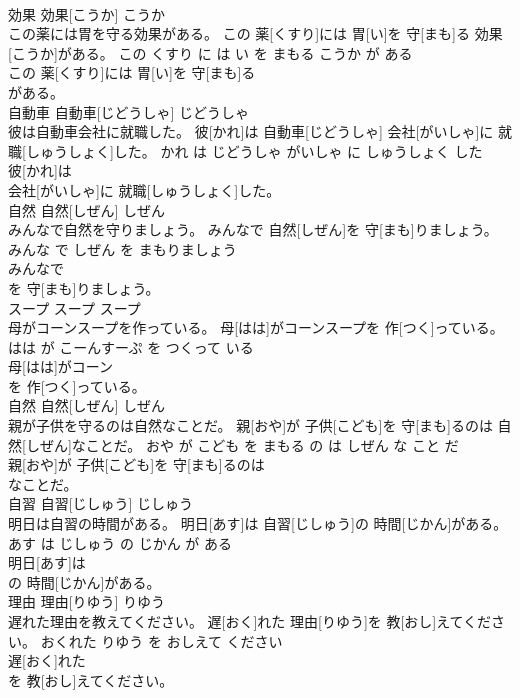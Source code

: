 \documentclass[8pt]{extreport}
\begin{document}
\begin{CJK}{UTF8}{min}
\\	効果	効果[こうか]	こうか	
\\	この薬には胃を守る効果がある。	この 薬[くすり]には 胃[い]を 守[まも]る 効果[こうか]がある。	この くすり に は い を まもる こうか が ある	
\\	この 薬[くすり]には 胃[い]を 守[まも]る
\\	がある。		
\\	自動車	自動車[じどうしゃ]	じどうしゃ	
\\	彼は自動車会社に就職した。	彼[かれ]は 自動車[じどうしゃ] 会社[がいしゃ]に 就職[しゅうしょく]した。	かれ は じどうしゃ がいしゃ に しゅうしょく した	
\\	彼[かれ]は
\\	会社[がいしゃ]に 就職[しゅうしょく]した。		
\\	自然	自然[しぜん]	しぜん	
\\	みんなで自然を守りましょう。	みんなで 自然[しぜん]を 守[まも]りましょう。	みんな で しぜん を まもりましょう	
\\	みんなで
\\	を 守[まも]りましょう。		
\\	スープ	スープ	スープ	
\\	母がコーンスープを作っている。	母[はは]がコーンスープを 作[つく]っている。	はは が こーんすーぷ を つくって いる	
\\	母[はは]がコーン
\\	を 作[つく]っている。		
\\	自然	自然[しぜん]	しぜん	
\\	親が子供を守るのは自然なことだ。	親[おや]が 子供[こども]を 守[まも]るのは 自然[しぜん]なことだ。	おや が こども を まもる の は しぜん な こと だ	
\\	親[おや]が 子供[こども]を 守[まも]るのは
\\	なことだ。		
\\	自習	自習[じしゅう]	じしゅう	
\\	明日は自習の時間がある。	明日[あす]は 自習[じしゅう]の 時間[じかん]がある。	あす は じしゅう の じかん が ある	
\\	明日[あす]は
\\	の 時間[じかん]がある。		
\\	理由	理由[りゆう]	りゆう	
\\	遅れた理由を教えてください。	遅[おく]れた 理由[りゆう]を 教[おし]えてください。	おくれた りゆう を おしえて ください	
\\	遅[おく]れた
\\	を 教[おし]えてください。		

\end{CJK}
\end{document}
